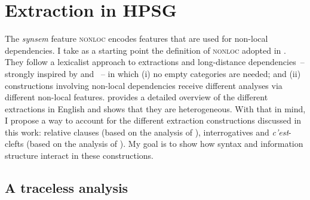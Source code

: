 \section{Extraction in HPSG}
\label{ch:hpsg-extraction}

The \emph{synsem} feature \textsc{nonloc} encodes features that are used for non-local dependencies. I take as a starting point the definition of \textsc{nonloc} adopted in \citet{Borsley.2020.HPSG.UDC}. They follow a lexicalist approach to extractions and long-distance dependencies~-- strongly inspired by \citet{Bouma.2001} and \citet{Ginzburg.2000}~-- in which (i) no empty categories are needed; and (ii) constructions involving non-local dependencies receive different analyses via different non-local features. \citet{Sag.2010} provides a detailed overview of the different extractions in English and shows that they are heterogeneous. With that in mind, I propose a way to account for the different extraction constructions discussed in this work: relative clauses (based on the analysis of \citet{Abeille.2007.Relatives}), interrogatives and \emph{c'est}-clefts (based on the analysis of \citet{Winckel.2020}). My goal is to show how syntax and information structure interact in these constructions.

\subsection{A traceless analysis}


